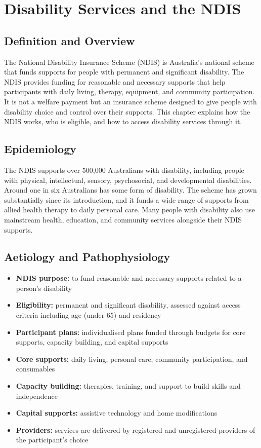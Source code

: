 \chapter{Disability Services and the NDIS}

\section*{Definition and Overview}
The National Disability Insurance Scheme (NDIS) is Australia's national scheme that funds supports for people with permanent and significant disability. The NDIS provides funding for reasonable and necessary supports that help participants with daily living, therapy, equipment, and community participation. It is not a welfare payment but an insurance scheme designed to give people with disability choice and control over their supports. This chapter explains how the NDIS works, who is eligible, and how to access disability services through it.

\section*{Epidemiology}
The NDIS supports over 500,000 Australians with disability, including people with physical, intellectual, sensory, psychosocial, and developmental disabilities. Around one in six Australians has some form of disability. The scheme has grown substantially since its introduction, and it funds a wide range of supports from allied health therapy to daily personal care. Many people with disability also use mainstream health, education, and community services alongside their NDIS supports.

\section*{Aetiology and Pathophysiology}
\begin{itemize}
    \item \textbf{NDIS purpose:} to fund reasonable and necessary supports related to a person's disability
    \item \textbf{Eligibility:} permanent and significant disability, assessed against access criteria including age (under 65) and residency
    \item \textbf{Participant plans:} individualised plans funded through budgets for core supports, capacity building, and capital supports
    \item \textbf{Core supports:} daily living, personal care, community participation, and consumables
    \item \textbf{Capacity building:} therapies, training, and support to build skills and independence
    \item \textbf{Capital supports:} assistive technology and home modifications
    \item \textbf{Providers:} services are delivered by registered and unregistered providers of the participant's choice
\end{itemize}

